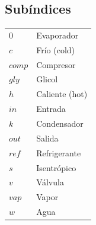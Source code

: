 \documentclass[../main.tex]{subfiles}
\begin{document}
\newpage

\vspace{2em}

\subsection*{Subíndices}

\begin{tabularx}{\textwidth}{@{}l X@{}}
$0$ & Evaporador \\
$c$ & Frío (cold) \\
$comp$ & Compresor \\
$gly$ & Glicol \\
$h$ & Caliente (hot) \\
$in$ & Entrada \\
$k$ & Condensador \\
$out$ & Salida \\
$ref$ & Refrigerante \\
$s$ & Isentrópico \\
$v$ & Válvula \\
$vap$ & Vapor \\
$w$ & Agua \\
\end{tabularx}

\newpage
\end{document}
